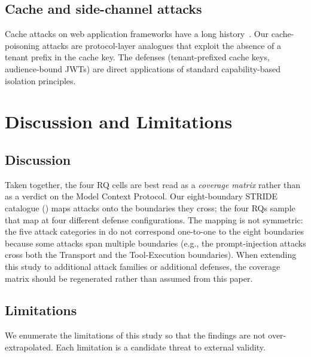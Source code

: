 \documentclass[sigconf, anonymous, natbib=false]{acmart}
\begin{document}
\subsection{Cache and side-channel attacks}

Cache attacks on web application frameworks have a long
history~\cite{shusterman2019robust}. Our cache-poisoning
attacks are protocol-layer analogues that exploit the
absence of a tenant prefix in the cache key. The
defenses (tenant-prefixed cache keys, audience-bound JWTs)
are direct applications of standard capability-based
isolation principles.

\section{Discussion and Limitations}\label{sec:discussion}

\subsection{Discussion}

Taken together, the four RQ cells are best read as a
\emph{coverage matrix} rather than as a verdict on the
Model Context Protocol. Our eight-boundary STRIDE catalogue
() maps attacks onto the boundaries
they cross; the four RQs sample that map at four different
defense configurations. The mapping is not symmetric: the
five attack categories in  do not
correspond one-to-one to the eight boundaries because some
attacks span multiple boundaries (e.g., the prompt-injection
attacks cross both the Transport and the Tool-Execution
boundaries). When extending this study to additional attack
families or additional defenses, the coverage matrix should
be regenerated rather than assumed from this paper.

\subsection{Limitations}

We enumerate the limitations of this study so that the
findings are not over-extrapolated. Each limitation is a
candidate threat to external validity.
\end{document}
